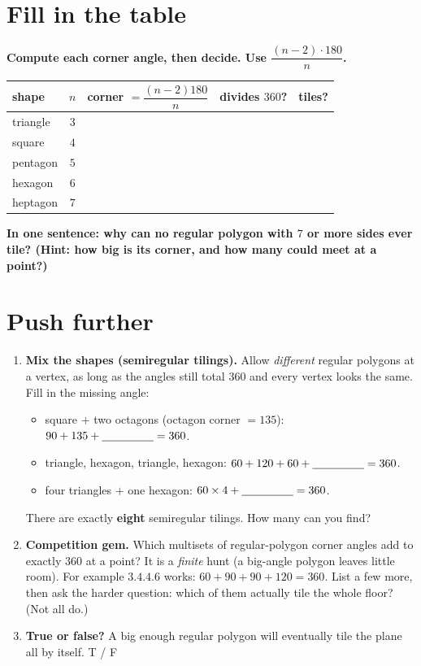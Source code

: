 \documentclass[11pt]{article}
\newcommand{\drawbox}[1]{%
  \par\vspace{4pt}\noindent
  \fbox{\rule{0pt}{#1}\rule{\dimexpr\linewidth-2\fboxsep-2\fboxrule}{0pt}}%
  \par\vspace{6pt}}
\newcommand{\task}[1]{\par\medskip\noindent\textbf{\color{benblue}#1}\par\nopagebreak}
\begin{document}
\section*{Fill in the table}
\task{Compute each corner angle, then decide. Use $\dfrac{(n-2)\cdot 180}{n}$.}

\begin{center}
\begin{tabular}{|l|c|c|c|c|}
\hline
shape & $n$ & corner $=\dfrac{(n-2)180}{n}$ & divides $360$? & tiles? \\[6pt] \hline
triangle & $3$ & & & \\[12pt] \hline
square   & $4$ & & & \\[12pt] \hline
pentagon & $5$ & & & \\[12pt] \hline
hexagon  & $6$ & & & \\[12pt] \hline
heptagon & $7$ & & & \\[12pt] \hline
\end{tabular}
\end{center}

\task{In one sentence: why can no regular polygon with $7$ or more sides ever
tile? (Hint: how big is its corner, and how many could meet at a point?)}
\drawbox{2.2cm}

\section*{Push further}
\begin{enumerate}[leftmargin=*]
  \item \textbf{Mix the shapes (semiregular tilings).} Allow \emph{different}
        regular polygons at a vertex, as long as the angles still total $360$ and
        every vertex looks the same. Fill in the missing angle:
        \begin{itemize}
          \item square $+$ two octagons (octagon corner $=135$):
                $90 + 135 + \underline{\hspace{1.6cm}} = 360$.
          \item triangle, hexagon, triangle, hexagon:
                $60 + 120 + 60 + \underline{\hspace{1.6cm}} = 360$.
          \item four triangles $+$ one hexagon:
                $60\times 4 + \underline{\hspace{1.6cm}} = 360$.
        \end{itemize}
        There are exactly \textbf{eight} semiregular tilings. How many can you find?
  \item \textbf{Competition gem.} Which multisets of regular-polygon corner
        angles add to exactly $360$ at a point? It is a \emph{finite} hunt (a
        big-angle polygon leaves little room). For example $3.4.4.6$ works:
        $60 + 90 + 90 + 120 = 360$. List a few more, then ask the harder
        question: which of them actually tile the whole floor? (Not all do.)
  \item \textbf{True or false?} A big enough regular polygon will eventually tile
        the plane all by itself. \hfill T \quad / \quad F
\end{enumerate}
\end{document}
